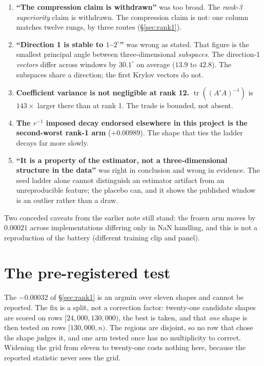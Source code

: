 \documentclass[11pt,a4paper]{article}
\begin{document}
\begin{enumerate}\itemsep3pt
  \item \textbf{``The compression claim is withdrawn''} was too broad. The
        \emph{rank-3 superiority} claim is withdrawn. The compression claim is
        not: one column matches twelve rungs, by three routes
        (\S\ref{sec:rank1}).
  \item \textbf{``Direction 1 is stable to $1$--$2^{\circ}$''} was wrong as
        stated. That figure is the smallest principal angle between
        three-dimensional \emph{subspaces}. The direction-1 \emph{vectors}
        differ across windows by $30.1^{\circ}$ on average ($13.9$ to
        $42.8$). The subspaces share a direction; the first Krylov vectors do
        not.
  \item \textbf{Coefficient variance is not negligible at rank 12.}
        $\operatorname{tr}((A'A)^{-1})$ is $143\times$ larger there than at
        rank 1. The trade is bounded, not absent.
  \item \textbf{The $r^{-1}$ imposed decay endorsed elsewhere in this project
        is the second-worst rank-1 arm} ($+0.00989$). The shape that ties the
        ladder decays far more slowly.
  \item \textbf{``It is a property of the estimator, not a
        three-dimensional structure in the data''} was right in conclusion and
        wrong in evidence. The seed ladder alone cannot distinguish an
        estimator artifact from an unreproducible feature; the placebo can, and
        it shows the published window is an outlier rather than a draw.
\end{enumerate}

\noindent
Two conceded caveats from the earlier note still stand: the frozen arm moves
by $0.00021$ across implementations differing only in NaN handling, and this is
not a reproduction of the battery (different training clip and panel).

\section{The pre-registered test}
\label{sec:prereg}

The $-0.00032$ of \S\ref{sec:rank1} is an argmin over eleven shapes and cannot
be reported. The fix is a split, not a correction factor: twenty-one candidate
shapes are scored on rows $[24{,}000, 130{,}000)$, the best is taken, and that
\emph{one} shape is then tested on rows $[130{,}000, n)$. The regions are
disjoint, so no row that chose the shape judges it, and one arm tested once has
no multiplicity to correct. Widening the grid from eleven to twenty-one costs
nothing here, because the reported statistic never sees the grid.
\end{document}
